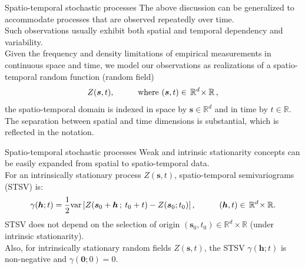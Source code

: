 \documentclass{beamer}
\begin{document}
\begin{frame}{Spatio-temporal stochastic processes}
The above discussion can be generalized to accommodate processes that are observed repeatedly over time. \\ \medskip 
Such observations usually exhibit both spatial and temporal dependency and variability.\\ \medskip  
Given the frequency and density limitations of empirical measurements in continuous space and time, we model our observations as realizations of a spatio-temporal random function (random field)
\begin{equation*} 
Z(\bm{s},t), \hspace{1cm} \textnormal{where~} (\bm{s},t) \in \, \mathbb{R}^d \! \times \mathbb{R} \,,
\end{equation*}
the spatio-temporal domain is indexed in space by $\bm{s} \in \mathbb{R}^d$ and in time by $t \in \mathbb{R}$. \\ \medskip 
The separation between spatial and time dimensions is substantial, which is reflected in the notation.
\end{frame}
\begin{frame}{Spatio-temporal stochastic processes}
Weak and intrinsic stationarity concepts can be easily expanded from spatial to spatio-temporal data. \\ \medskip
For an intrinsically stationary process $Z(\bm{s},t)$, spatio-temporal semivariograms (STSV) is:
\begin{equation*} 
\gamma(\bm{h};t) = \frac{1}{2} \textnormal{var} \left[ Z(\bm{s}_0+\bm{h} \, ; \> t_0 + t) - Z(\bm{s}_0;t_0) \right],
\hspace{1cm} (\bm{h},t) \in \, \mathbb{R}^d \! \times \mathbb{R}.
\end{equation*}
STSV does not depend on the selection of origin $(\bm{s}_0, t_0) \in \mathbb{R}^d \! \times \mathbb{R}$ (under intrinsic stationarity). \\ \medskip Also, for intrinsically stationary random fields $Z(\bm{s},t)$, the STSV $\gamma(\bm{h};t)$ is non-negative and $\gamma(\bm{0};0) = 0$.
\end{frame}
\end{document}
